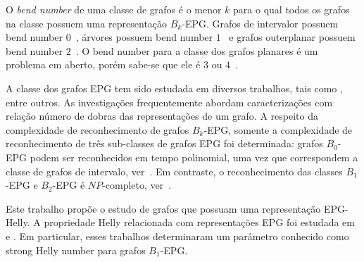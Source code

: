 O \emph{bend number} de uma classe de grafos é o menor  $k$ para o qual todos os grafos na classe possuem uma representação $B_k$-EPG. Grafos de intervalor possuem bend number $0$~\cite{golumbic2009}, árvores possuem  bend number $1$~\cite{golumbic2009} e  grafos outerplanar possuem bend number $2$~\cite{daniel2014b}. O bend number para a classe dos grafos planares é um problema em aberto, porém sabe-se que ele é $ 3 $ ou $4$~\cite{daniel2014b}. %

A classe dos grafos EPG tem sido estudada em diversos trabalhos, tais como  \cite{alcon2016, Asinowski2009, cohen2014, golumbic2009, heldt2014,  martin2017}, entre outros. As investigações frequentemente abordam caracterizações com relação número de dobras das representações de um grafo. A respeito da complexidade de reconhecimento de grafos $B_k$-EPG, somente a complexidade de reconhecimento de três sub-classes de grafos EPG foi determinada:
 grafos $B_0$-EPG podem ser reconhecidos em tempo polinomial, uma vez que correspondem a classe de grafos de intervalo, ver~\cite{booth1976}. Em contraste, o reconhecimento das classes $B_1$-EPG e $B_2$-EPG é $NP$-completo, ver~\cite{heldt2014, martin2017}.







Este trabalho propõe o estudo de grafos que possuam uma representação EPG-Helly. 
A propriedade Helly relacionada com representações EPG foi  estudada em~\cite{golumbic2009} e \cite{golumbic2013}. Em particular, esses trabalhos determinaram um parâmetro conhecido como strong Helly number  para grafos $B_1$-EPG. 

